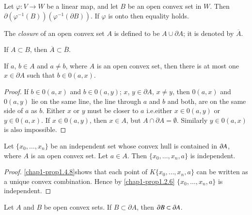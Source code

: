 \begin{ex}\label{chap1-ex1.4.5}
Let $\varphi:V\to W$ be a linear map, and let $B$ be an open convex set in $W$. Then $\partial (\varphi^{-1}(B))(\varphi^{-1}(\partial B))$. If $\varphi$ is onto then equality holds.
\end{ex}

\begin{definition}\label{chap1-defi1.4.6}
The {\em closure} of an open convex set $A$ is defined to be $A\cup \partial A$; it is denoted by $\overline{A}$.
\end{definition}

\begin{ex}\label{chap1-ex1.4.7}
If $A\subset B$, then $\overline{A}\subset \overline{B}$.
\end{ex}

\begin{proposition}\label{chap1-prop1.4.8}
If $a$, $b\in A$ and $a\neq b$, where $A$ is an open convex set, then there is at most one $x\in \partial A$ such that $b\in 0(a,x)$.
\end{proposition}

\begin{proof}
If $b\in 0(a,x)$ and $b\in 0(a,y)$; $x$, $y\in \partial A$, $x\neq y$, then $0(a,x)$ and $0(a,y)$ lie on the same line, the line through $a$ and $b$ and both, are on the same side of $a$ as $b$. Either $x$ or $y$ must be closer to $a$ i.e.\@ either $x\in 0(a,y)$ or $y\in 0(a,x)$. If $x\in 0(a,y)$, then $x\in A$, but $A\cap \partial A=\emptyset$. Similarly $y\in 0(a,x)$ is also impossible. 
\end{proof}

\begin{proposition}\label{chap1-prop1.4.9}
Let $\{x_{0},\ldots,x_{n}\}$ be an independent set whose convex hull is contained in $\partial A$, where $A$ is an open convex set. Let $a\in A$. Then $\{x_{0},\ldots,x_{n},a\}$ is independent.
\end{proposition}

\begin{proof}
\ref{chap1-prop1.4.8}\pageoriginale shows that each point of $K\{x_{0},\ldots,x_{n},a\}$ can be written as a unique convex combination. Hence by \ref{chap1-prop1.2.6} $\{x_{0},\ldots,x_{n},a\}$ is independent.
\end{proof}

\begin{proposition}\label{chap1-prop1.4.10}
Let $A$ and $B$ be open convex sets. If $B\subset \partial A$, then $\partial B\subset \partial A$.
\end{proposition}

